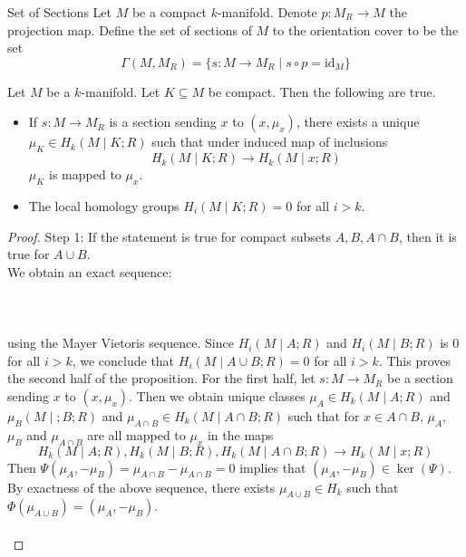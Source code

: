 \documentclass[a4paper]{article}
\begin{document}
\begin{defn}{Set of Sections}{} Let $M$ be a compact $k$-manifold. Denote $p:M_R\to M$ the projection map. Define the set of sections of $M$ to the orientation cover to be the set $$\Gamma(M,M_R)=\{s:M\to M_R\;|\;s\circ p=\text{id}_M\}$$
\end{defn}

\begin{prp}{}{} Let $M$ be a $k$-manifold. Let $K\subseteq M$ be compact. Then the following are true. 
\begin{itemize}
\item If $s:M\to M_R$ is a section sending $x$ to $(x,\mu_x)$, there exists a unique $\mu_K\in H_k(M\;|\;K;R)$ such that under induced map of inclusions $$H_k(M\;|\;K;R)\to H_k(M\;|\;x;R)$$ $\mu_K$ is mapped to $\mu_x$. 
\item The local homology groups $H_i(M\;|\;K;R)=0$ for all $i>k$. 
\end{itemize} \tcbline
\begin{proof}
Step 1: If the statement is true for compact subsets $A,B,A\cap B$, then it is true for $A\cup B$. \\
We obtain an exact sequence: \\~\\
\\~\\
using the Mayer Vietoris sequence. Since $H_i(M\;|\;A;R)$ and $H_i(M\;|\;B;R)$ is $0$ for all $i>k$, we conclude that $H_i(M\;|\;A\cup B;R)=0$ for all $i>k$. This proves the second half of the proposition. For the first half, let $s:M\to M_R$ be a section sending $x$ to $(x,\mu_x)$. Then we obtain unique classes $\mu_A\in H_k(M\;|\;A;R)$ and $\mu_B(M\;|\;;B;R)$ and $\mu_{A\cap B}\in H_k(M\;|\;A\cap B;R)$ such that for $x\in A\cap B$, $\mu_A$, $\mu_B$ and $\mu_{A\cap B}$ are all mapped to $\mu_x$ in the maps $$H_k(M\;|\;A;R),H_k(M\;|\;B;R),H_k(M\;|\;A\cap B;R)\to H_k(M\;|\;x;R)$$ Then $\Psi(\mu_A,-\mu_B)=\mu_{A\cap B}-\mu_{A\cap B}=0$ implies that $(\mu_A,-\mu_B)\in\ker(\Psi)$. By exactness of the above sequence, there exists $\mu_{A\cup B}\in H_k$ such that $\Phi(\mu_{A\cup B})=(\mu_A,-\mu_B)$. \\~\\


\end{proof}
\end{prp}
\end{document}

